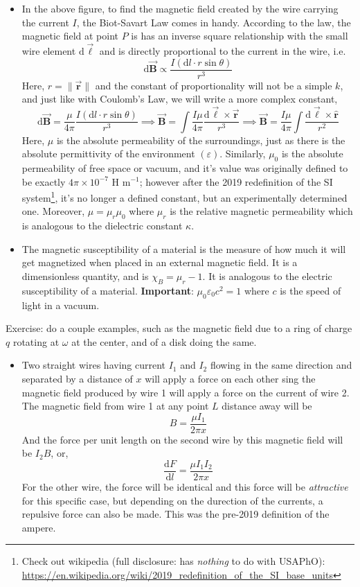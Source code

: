 \documentclass{scrartcl}
\begin{document}
    \begin{itemize}
        \item In the above figure, to find the magnetic field created by the wire carrying the current $I$, the Biot-Savart Law comes in handy. According to the law, the magnetic field at point $P$ is has an inverse square relationship with the small wire element $\mathrm d\vec{\mathbf\ell}$ and is directly proportional to the current in the wire, i.e. \[\mathrm d\vec{\mathbf B}\propto\frac{I\left(\mathrm dl\cdot r\sin\theta\right)}{r^3}\] Here, $r=\|\vec{\mathbf r}\|$ and the constant of proportionality will  not be a simple $k$, and just like with Coulomb's Law, we will write a more complex constant, \[\mathrm d\vec{\mathbf B}=\frac{\mu}{4\pi}\frac{I\left(\mathrm dl\cdot r\sin\theta\right)}{r^3}\implies\vec{\mathbf B}=\int\frac{I\mu}{4\pi}\frac{\mathrm d\vec{\mathbf\ell}\times\vec{\mathbf r}}{r^3}\implies\boxed{\vec{\mathbf B}=\frac{I\mu}{4\pi}\int\frac{\mathrm d\vec{\mathbf\ell}\times\hat{\mathbf r}}{r^2}}\] Here, $\mu$ is the absolute permeability of the surroundings, just as there is the absolute permittivity of the environment $\left(\varepsilon\right)$. Similarly, $\mu_0$ is the absolute permeability of free space or vacuum, and it's value was originally defined to be exactly $4\pi\times10^{-7}$ H m$^{-1}$; however after the 2019 redefinition of the SI system\footnote[2]{\label{secondfootnote}Check out wikipedia (full disclosure: has \textit{nothing} to do with USAPhO):\\\url{https://en.wikipedia.org/wiki/2019_redefinition_of_the_SI_base_units}}, it's no longer a defined constant, but an experimentally determined one. Moreover, $\mu=\mu_r\mu_0$ where $\mu_r$ is the relative magnetic permeability which is analogous to the dielectric constant $\kappa$.
        \item The magnetic susceptibility of a material is the measure of how much it will get magnetized when placed in an external magnetic field. It is a dimensionless quantity, and is $\chi_B=\mu_r-1$. It is analogous to the electric susceptibility of a material. \textbf{Important}: $\boxed{\mu_0\varepsilon_0c^2=1}$ where $c$ is the speed of light in a vacuum.
    \end{itemize}
    Exercise: do a couple examples, such as the magnetic field due to a ring of charge $q$ rotating at $\omega$ at the center, and of a disk doing the same.
    \begin{itemize}
        \item Two straight wires having current $I_1$ and $I_2$ flowing in the same direction and separated by a distance of $x$ will apply a force on each other sing the magnetic field produced by wire 1 will apply a force on the current of wire 2. The magnetic field from wire 1 at any point $L$ distance away will be \[B=\frac{\mu I_1}{2\pi x}\] And the force per unit length on the second wire by this magnetic field will be $I_2B$, or, \[\boxed{\frac{\mathrm dF}{\mathrm dl}=\frac{\mu I_1I_2}{2\pi x}}\] For the other wire, the force will be identical and this force will be \textit{attractive} for this specific case, but depending on the durection of the currents, a repulsive force can also be made. This was the pre-2019 definition of the ampere.
    \end{itemize}
\end{document}
